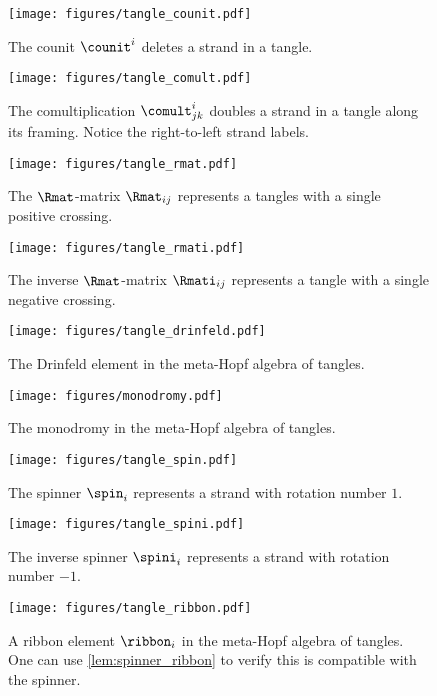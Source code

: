 \begin{figure}[h]
        \centering
        \texttt{[image: figures/tangle\_counit.pdf]}
        \caption{The counit $\counit^i$ deletes a strand in a tangle.}
        \label{fig:tangle_counit}
\end{figure}
\begin{figure}[h]
\centering
\texttt{[image: figures/tangle\_comult.pdf]}
\caption{The comultiplication $\comult^{i}_{jk}$ doubles a strand in a tangle
along its framing. Notice the right-to-left strand labels.}
\label{fig:tangle_comult}
\end{figure}
\begin{figure}[h]
        \centering
        \begin{minipage}[c]{0.4\linewidth}
                \centering
                \texttt{[image: figures/tangle\_rmat.pdf]}
                \caption{The $\Rmat$-matrix $\Rmat_{ij}$ represents a tangles with a
                single positive crossing.}
                \label{fig:tangle_rmat}
        \end{minipage}
        \begin{minipage}[c]{0.4\linewidth}
                \centering
                \texttt{[image: figures/tangle\_rmati.pdf]}
                \caption{The inverse $\Rmat$-matrix $\Rmati_{ij}$ represents a
                        tangle with a single negative crossing.}
                \label{fig:tangle_rmati}
        \end{minipage}
\end{figure}
\begin{figure}[h]
        \centering
        \texttt{[image: figures/tangle\_drinfeld.pdf]}
        \caption{The Drinfeld element in the meta-Hopf algebra of tangles.}
        \label{fig:tangle_drinfeld}
\end{figure}
\begin{figure}[h]
        \centering
        \texttt{[image: figures/monodromy.pdf]}
        \caption{The monodromy in the meta-Hopf algebra of tangles.}
        \label{fig:monodromy}
\end{figure}
\begin{figure}[h]
        \centering
        \texttt{[image: figures/tangle\_spin.pdf]}
        \caption{The spinner $\spin_i$ represents a strand with rotation number
        $1$.}
        \label{fig:tangle_spin}
\end{figure}
\begin{figure}[h]
        \centering
        \texttt{[image: figures/tangle\_spini.pdf]}
        \caption{The inverse spinner $\spini_i$ represents a strand with
                rotation number $-1$.}
        \label{fig:tangle_spini}
\end{figure}
\begin{figure}[h]
        \centering
        \texttt{[image: figures/tangle\_ribbon.pdf]}
        \caption{A ribbon element $\ribbon_i$ in the meta-Hopf algebra of
                tangles. One can use \cref{lem:spinner_ribbon} to verify this is
                compatible with the spinner.
        }
        \label{fig:tangle_ribbon}
\end{figure}

